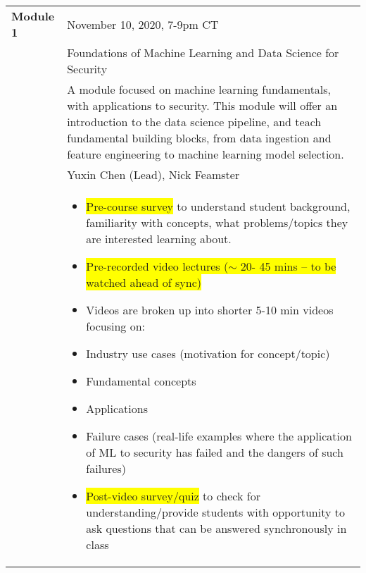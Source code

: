 \documentclass[12pt]{article}
\renewcommand{\_}{\kern-1.5pt\textunderscore\kern-1.5pt}
\begin{document}
\begin{table}[H]
 			\centering
\begin{tabular}{p{1.1in}p{5.0in}}
\hline
\multicolumn{1}{|p{1.1in}}{\cellcolor[HTML]{EFEFEF}\textbf{Module 1 }} & 
\multicolumn{1}{|p{5.0in}|}{\cellcolor[HTML]{EFEFEF}November 10, 2020, 7-9pm CT } \\
\hhline{--}
\multicolumn{1}{|p{1.1in}}{\cellcolor[HTML]{EFEFEF}\textbf{Topic: }} & 
\multicolumn{1}{|p{5.0in}|}{\cellcolor[HTML]{EFEFEF}Foundations of Machine Learning and Data Science for Security} \\
\hhline{--}
\multicolumn{1}{|p{1.1in}}{\textbf{Description: }} & 
\multicolumn{1}{|p{5.0in}|}{A module focused on machine learning fundamentals, with applications to security. This module will offer an introduction to the data science pipeline, and teach fundamental building blocks, from data ingestion and feature engineering to machine learning model selection. } \\
\hhline{--}
\multicolumn{1}{|p{1.1in}}{\textbf{Faculty Leads: }} & 
\multicolumn{1}{|p{5.0in}|}{Yuxin Chen (Lead), Nick Feamster } \\
\hhline{--}
\multicolumn{1}{|p{1.1in}}{\textbf{Asynchronous Content:}} & 
\multicolumn{1}{|p{5.0in}|}{\begin{itemize}
	\item \colorbox{Yellow}{Pre-course survey} to understand student background, familiarity with concepts, what problems/topics they are interested learning about.  \par 	\item \colorbox{Yellow}{Pre-recorded video lectures\textbf{ }($ \sim $  20- 45 mins -- to be watched ahead of sync)} \par 	\item Videos are broken up into shorter 5-10 min videos focusing on:  \par 	\item Industry use cases (motivation for concept/topic) \par 	\item Fundamental concepts  \par 	\item Applications \par 	\item Failure cases (real-life examples where the application of ML to security has failed and the dangers of such failures) \par 	\item \colorbox{Yellow}{Post-video survey/quiz} to check for understanding/provide students with opportunity to ask questions that can be answered synchronously in class 

\end{itemize}}
\end{tabular}
\end{table}
\end{document}
